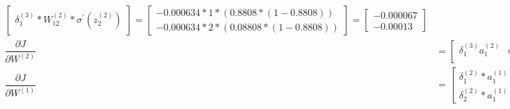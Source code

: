 \documentclass[12pt]{article}
\begin{document}
\begin{enumerate}
\begin{align*}
\begin{bmatrix}
				\delta_1^{(3)} * W_{12}^{(2)} * \sigma^\prime \left(z_2^{(2)}\right)
			\end{bmatrix}
		=
			\begin{bmatrix}
				-0.000634 * 1 * \left(0.8808 * (1-0.8808)\right)\\
				-0.000634 * 2 * \left(0.08808 * (1-0.8808)\right)
			\end{bmatrix}
		=
			\begin{bmatrix}
				-0.000067\\
				-0.00013
			\end{bmatrix}\\
		\dfrac{\partial J}{\partial W^{(2)}} &= 
			\begin{bmatrix}
				\delta_1^{(3)}a_1^{(2)} & \delta_1^{(3)}a_2^{(2)}\\
			\end{bmatrix}
		=	
			\begin{bmatrix}
				-0.00063 * 0.8808& -0.00063*0.8808
			\end{bmatrix}
		= \begin{bmatrix}
			-0.00055& -0.00055
		\end{bmatrix}\\
	\dfrac{\partial J}{\partial W^{(1)}} &= 
		\begin{bmatrix}
			\delta_1^{(2)} * a_1^{(1)} & \delta_1^{(2)} * a_2^{(1)}\\
			\delta_2^{(2)} * a_1^{(1)} & \delta_2^{(2)} * a_2^{(1)}
		\end{bmatrix}
	=
		\begin{bmatrix}
			-0.000067 * 1 & -0.000067 * 0\\
			-0.00013 * 1 & -0.00013 * 0
		\end{bmatrix}
	=
		\begin{bmatrix}
			-0.000067 & 0\\
			-0.00013 & 0
		\end{bmatrix}
	\end{align*}


\end{enumerate}
\end{document}
